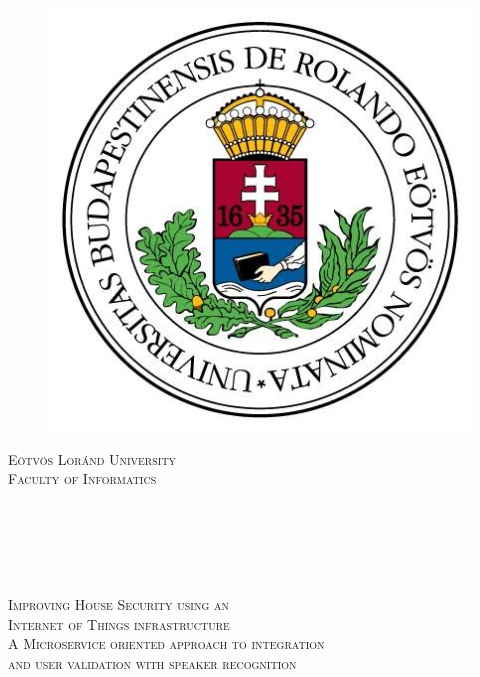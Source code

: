 \documentclass[a4paper,11pt]{report} %
\theoremstyle{change}
\theoremstyle{theoremstyle}
\def\mysubtitle{A Microservice oriented approach to integration and user validation with speaker recognition}
\begin{document}

\begin{titlepage}
\thispagestyle{empty}

\textcolor{white}{}
\begin{figure}
\vspace*{-30pt}
\includegraphics*[scale=0.25]{elte-logo.jpg}
\end{figure}
\vspace*{-30pt}
\begin{flushright}
{\fontsize{17.28}{20}
\scshape Eötvös Loránd University\\}
{\fontsize{14}{10}
\scshape Faculty of Informatics}
\end{flushright}
\textcolor{white}{
\\
\\
\\
 \\
}
\vspace{2cm}
\begin{center}
    {\fontsize{20}{20}  \scshape  Improving House Security using an}\\
    \vspace{0.05cm}
    {\fontsize{20}{20}  \scshape  Internet of Things infrastructure}\\
\vspace{0.5cm}
{\fontsize{15}{22}  \scshape  A Microservice oriented approach to integration}\\
{\fontsize{15}{22}  \scshape  and user validation with speaker recognition}\\
\end{center}


\end{titlepage}
\end{document}
